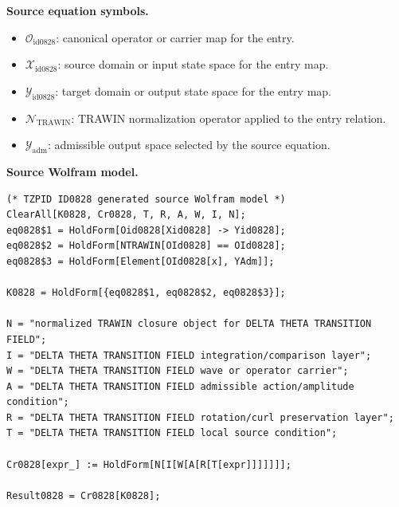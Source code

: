 \begin{minipage}[t]{0.49\linewidth}
\begingroup
\small
\raggedright
\textbf{Source equation symbols.}\par
\begin{itemize}[leftmargin=1.35em,itemsep=1pt,topsep=1pt,parsep=0pt]
    \item $\mathcal{O}_{\mathrm{id0828}}$: canonical operator or carrier map for the entry.
    \item $\mathcal{X}_{\mathrm{id0828}}$: source domain or input state space for the entry map.
    \item $\mathcal{Y}_{\mathrm{id0828}}$: target domain or output state space for the entry map.
    \item $\mathcal{N}_{\mathrm{TRAWIN}}$: TRAWIN normalization operator applied to the entry relation.
    \item $\mathcal{Y}_{\mathrm{adm}}$: admissible output space selected by the source equation.
\end{itemize}
\endgroup
\end{minipage}\hfill
\begin{minipage}[t]{0.47\linewidth}
\begingroup
\scriptsize
\raggedright
\textbf{Source Wolfram model.}\par
\begin{Verbatim}[fontsize=\tiny,breaklines=true,breakanywhere=true]
(* TZPID ID0828 generated source Wolfram model *)
ClearAll[K0828, Cr0828, T, R, A, W, I, N];
eq0828$1 = HoldForm[Oid0828[Xid0828] -> Yid0828];
eq0828$2 = HoldForm[NTRAWIN[OId0828] == OId0828];
eq0828$3 = HoldForm[Element[OId0828[x], YAdm]];

K0828 = HoldForm[{eq0828$1, eq0828$2, eq0828$3}];

N = "normalized TRAWIN closure object for DELTA THETA TRANSITION FIELD";
I = "DELTA THETA TRANSITION FIELD integration/comparison layer";
W = "DELTA THETA TRANSITION FIELD wave or operator carrier";
A = "DELTA THETA TRANSITION FIELD admissible action/amplitude condition";
R = "DELTA THETA TRANSITION FIELD rotation/curl preservation layer";
T = "DELTA THETA TRANSITION FIELD local source condition";

Cr0828[expr_] := HoldForm[N[I[W[A[R[T[expr]]]]]]];

Result0828 = Cr0828[K0828];
\end{Verbatim}
\endgroup
\end{minipage}

